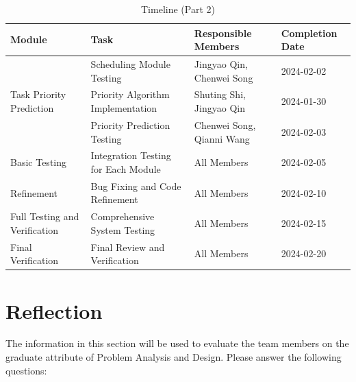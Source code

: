 \documentclass[12pt, titlepage]{article}
\begin{document}
\begin{table}[H]
\centering
\begin{tabular}{|p{}|p{}|p{}|p{}|}
\hline
\textbf{Module} & \textbf{Task} & \textbf{Responsible Members} & \textbf{Completion Date} \\
\hline
 & Scheduling Module Testing & Jingyao Qin, Chenwei Song & 2024-02-02 \\
\hline
Task Priority Prediction & Priority Algorithm Implementation & Shuting Shi, Jingyao Qin & 2024-01-30 \\
\hline
 & Priority Prediction Testing & Chenwei Song, Qianni Wang & 2024-02-03 \\
\hline
Basic Testing & Integration Testing for Each Module & All Members & 2024-02-05 \\
\hline
Refinement & Bug Fixing and Code Refinement & All Members & 2024-02-10 \\
\hline
Full Testing and Verification & Comprehensive System Testing & All Members & 2024-02-15 \\
\hline
Final Verification & Final Review and Verification & All Members & 2024-02-20 \\
\hline
\end{tabular}
\caption{Timeline (Part 2)}
\label{table:timeline2}
\end{table}




\section{Reflection}
The information in this section will be used to evaluate the team members on the
graduate attribute of Problem Analysis and Design.  Please answer the following questions:
\end{document}
